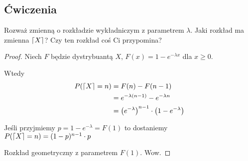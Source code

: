 \subsection{Ćwiczenia}

\begin{exercise}
	Rozważ zmienną o rozkładzie wykładniczym z parametrem \(\lambda\).
	Jaki rozkład ma zmienna \(\left\lceil X\right\rceil\)? Czy ten rozkład coś Ci przypomina?
\end{exercise}
\begin{proof}
	Niech \( F \) będzie dystrybuantą \( X \), \( F(x) = 1 - e^{-\lambda x} \) dla \( x \geq 0 \).

	Wtedy
	\begin{align*}
		P\pars{\ceil{X} = n}
		 & = F(n) - F(n - 1)                                         \\
		 & = e^{-\lambda(n-1)} - e^{-\lambda n}                      \\
		 & = \pars{e^{-\lambda}}^{n-1} \cdot \pars{1 - e^{-\lambda}}
	\end{align*}

	Jeśli przyjmiemy \( p = 1 - e^{-\lambda} = F(1) \) to dostaniemy \( P\pars{\ceil{X} = n} = (1-p)^{n-1} \cdot p \)

	Rozkład geometryczny z parametrem \(F(1)\). Wow.

\end{proof}
